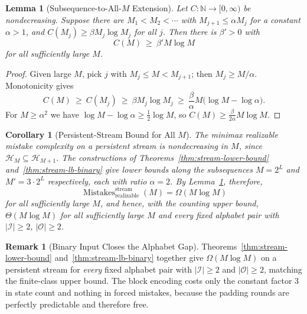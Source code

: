 \documentclass[12pt]{article}
\newtheorem{lemma}[theorem]{Lemma}
\newtheorem{corollary}[theorem]{Corollary}
\theoremstyle{definition}
\newtheorem{remark}[theorem]{Remark}
\begin{document}
\begin{lemma}[Subsequence-to-All-$M$ Extension]
\label{lem:subsequence-allM}
Let $C:\mathbb N\to[0,\infty)$ be nondecreasing.  Suppose there are
$M_1<M_2<\cdots$ with $M_{j+1}\le\alpha M_j$ for a constant $\alpha>1$, and
$C(M_j)\ge\beta M_j\log M_j$ for all $j$.  Then there is $\beta'>0$ with
\[
C(M)\ \ge\ \beta'M\log M
\]
for all sufficiently large $M$.
\end{lemma}

\begin{proof}
Given large $M$, pick $j$ with $M_j\le M<M_{j+1}$; then $M_j\ge M/\alpha$.
Monotonicity gives
\[
C(M)\ \ge\ C(M_j)\ \ge\ \beta M_j\log M_j
\ \ge\ \frac{\beta}{\alpha}M\bigl(\log M-\log\alpha\bigr).
\]
For $M\ge\alpha^2$ we have $\log M-\log\alpha\ge\tfrac12\log M$, so
$C(M)\ge\frac{\beta}{2\alpha}M\log M$.
\end{proof}

\begin{corollary}[Persistent-Stream Bound for All $M$]
\label{cor:stream-all-M}
The minimax realizable mistake complexity on a persistent stream is
nondecreasing in $M$, since $\mathcal H_M\subseteq\mathcal H_{M+1}$.  The
constructions of Theorems~\ref{thm:stream-lower-bound}
and~\ref{thm:stream-lb-binary} give lower bounds along the subsequences
$M=2^L$ and $M'=3\cdot2^L$ respectively, each with ratio $\alpha=2$.  By
Lemma~\ref{lem:subsequence-allM}, therefore,
\[
\operatorname{Mistakes}^{\mathrm{stream}}_{\mathrm{realizable}}(M)
=
\Omega(M\log M)
\]
for \emph{all} sufficiently large $M$, and hence, with the counting upper
bound, $\Theta(M\log M)$ for all sufficiently large $M$ and every fixed
alphabet pair with $|\mathcal I|\ge2$, $|\mathcal O|\ge2$.
\end{corollary}

\begin{remark}[Binary Input Closes the Alphabet Gap]
\label{rem:stream-lb-binary}
Theorems~\ref{thm:stream-lower-bound} and~\ref{thm:stream-lb-binary} together
give $\Omega(M\log M)$ on a persistent stream for \emph{every} fixed alphabet
pair with $|\mathcal I|\ge2$ and $|\mathcal O|\ge2$, matching the finite-class
upper bound.  The block encoding costs only the constant factor $3$ in state
count and nothing in forced mistakes, because the padding rounds are
perfectly predictable and therefore free.
\end{remark}
\end{document}
